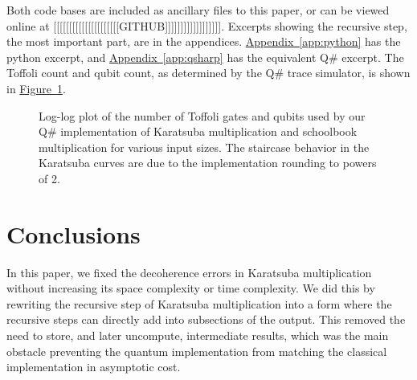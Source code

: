 \documentclass[onecolumn]{quantumarticle}
\DeclareRobustCommand{\app}[1]{\hyperref[app:#1]{Appendix~\ref*{app:#1}}}
\newcommand{\fig}[1]{\hyperref[fig:#1]{Figure~\ref*{fig:#1}}}
\begin{document}
Both code bases are included as ancillary files to this paper, or can be viewed online at [[[[[[[[[[[[[[[[[[[[[GITHUB]]]]]]]]]]]]]]]]]].
Excerpts showing the recursive step, the most important part, are in the appendices.
\app{python} has the python excerpt, and \app{qsharp} has the equivalent Q\# excerpt.
The Toffoli count and qubit count, as determined by the Q\# trace simulator, is shown in \fig{data}.

\begin{figure}
    \centering
    \caption{
    \label{fig:data}
    Log-log plot of the number of Toffoli gates and qubits used by our Q\# implementation of Karatsuba multiplication and schoolbook multiplication for various input sizes.
    The staircase behavior in the Karatsuba curves are due to the implementation rounding to powers of 2.
    }
\end{figure}

\section{Conclusions}
\label{sec:conclusion}

In this paper, we fixed the decoherence errors in Karatsuba multiplication without increasing its space complexity or time complexity.
We did this by rewriting the recursive step of Karatsuba multiplication into a form where the recursive steps can directly add into subsections of the output.
This removed the need to store, and later uncompute, intermediate results, which was the main obstacle preventing the quantum implementation from matching the classical implementation in asymptotic cost.
\end{document}
